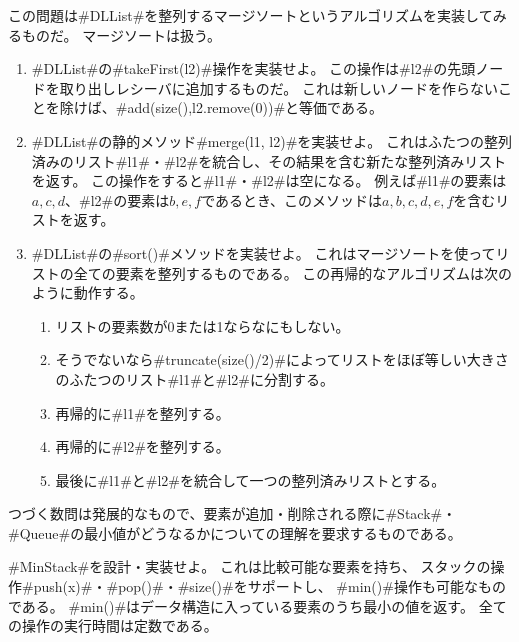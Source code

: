 \begin{exc}
  この問題は#DLList#を整列するマージソートというアルゴリズムを実装してみるものだ。
  マージソートは扱う。
  \begin{enumerate}
    \item #DLList#の#takeFirst(l2)#操作を実装せよ。
	この操作は#l2#の先頭ノードを取り出しレシーバに追加するものだ。
	これは新しいノードを作らないことを除けば、#add(size(),l2.remove(0))#と等価である。
    \item #DLList#の静的メソッド#merge(l1, l2)#を実装せよ。
	これはふたつの整列済みのリスト#l1#・#l2#を統合し、その結果を含む新たな整列済みリストを返す。
	この操作をすると#l1#・#l2#は空になる。
	例えば#l1#の要素は$a,c,d$、#l2#の要素は$b,e,f$であるとき、このメソッドは$a,b,c,d,e,f$を含むリストを返す。
    \item #DLList#の#sort()#メソッドを実装せよ。
	これはマージソートを使ってリストの全ての要素を整列するものである。
	この再帰的なアルゴリズムは次のように動作する。
       \begin{enumerate}
          \item リストの要素数が0または1ならなにもしない。
          \item そうでないなら#truncate(size()/2)#によってリストをほぼ等しい大きさのふたつのリスト#l1#と#l2#に分割する。
          \item 再帰的に#l1#を整列する。
          \item 再帰的に#l2#を整列する。
          \item 最後に#l1#と#l2#を統合して一つの整列済みリストとする。
       \end{enumerate}
  \end{enumerate}
\end{exc}

つづく数問は発展的なもので、要素が追加・削除される際に#Stack#・#Queue#の最小値がどうなるかについての理解を要求するものである。

\begin{exc}
  #MinStack#を設計・実装せよ。
  これは比較可能な要素を持ち、
  スタックの操作#push(x)#・#pop()#・#size()#をサポートし、
  #min()#操作も可能なものである。
  #min()#はデータ構造に入っている要素のうち最小の値を返す。
  全ての操作の実行時間は定数である。
\end{exc}

